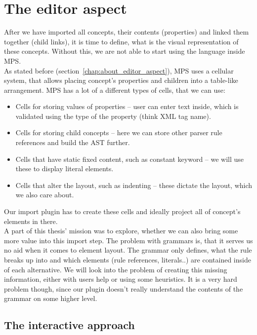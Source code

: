 \section{The editor aspect}
\label{chap:editor_aspect}
After we have imported all concepts, their contents (properties) and linked them together (child links), it is time to define, what is the visual representation of these concepts.
Without this, we are not able to start using the language inside MPS.
\\

As stated before (section~\ref{chap:about_editor_aspect}), MPS uses a cellular system, that allows placing concept's properties and children into a table-like arrangement.
MPS has a lot of a different types of cells, that we can use:

\begin{itemize}
	\item Cells for storing values of properties -- user can enter text inside, which is validated using the type of the property (think XML tag name).
	
	\item Cells for storing child concepts -- here we can store other parser rule references and build the AST further.
	
	\item Cells that have static fixed content, such as constant keyword -- we will use these to display literal elements.
	
	\item Cells that alter the layout, such as indenting -- these dictate the layout, which we also care about.
\end{itemize}

Our import plugin has to create these cells and ideally project all of concept's elements in there.
\\

A part of this thesis' mission was to explore, whether we can also bring some more value into this import step.
The problem with grammars is, that it serves us no aid when it comes to element layout.
The grammar only defines, what the rule breaks up into and which elements (rule references, literals..) are contained inside of each alternative.
We will look into the problem of creating this missing information, either with users help or using some heuristics.
It is a very hard problem though, since our plugin doesn't really understand the contents of the grammar on some higher level.

\subsection{The interactive approach}

